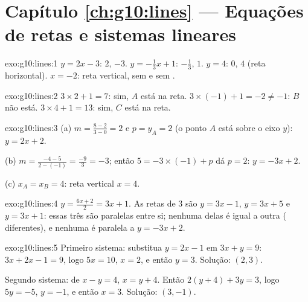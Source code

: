 \section*{Capítulo \ref{ch:g10:lines} --- Equações de retas e sistemas lineares}

\begin{solution}{exo:g10:lines:1}
$y = 2x - 3$:  $2$,  $-3$.
$y = -\frac13 x + 1$:  $-\frac13$, 
$1$.
$y = 4$:  $0$,  $4$ (reta
horizontal).
$x = -2$: reta vertical, sem  e sem .
\end{solution}

\begin{solution}{exo:g10:lines:2}
$3 \times 2 + 1 = 7$: sim, $A$ está na reta.
$3 \times (-1) + 1 = -2 \neq -1$: $B$ não está.
$3 \times 4 + 1 = 13$: sim, $C$ está na reta.
\end{solution}

\begin{solution}{exo:g10:lines:3}
(a) $m = \frac{8 - 2}{3 - 0} = 2$ e $p = y_A = 2$ (o ponto $A$ está sobre
o eixo $y$): $y = 2x + 2$.

(b) $m = \frac{-4 - 5}{2 - (-1)} = \frac{-9}{3} = -3$; então
$5 = -3 \times (-1) + p$ dá $p = 2$: $y = -3x + 2$.

(c) $x_A = x_B = 4$: reta vertical $x = 4$.
\end{solution}

\begin{solution}{exo:g10:lines:4}
$y = \frac{6x+2}{2} = 3x + 1$. As retas de  $3$ são
$y = 3x - 1$, $y = 3x + 5$ e $y = 3x + 1$: essas três são paralelas entre
si; nenhuma delas é igual a outra ( diferentes), e
nenhuma é paralela a $y = -3x + 2$.
\end{solution}

\begin{solution}{exo:g10:lines:5}
Primeiro sistema: substitua $y = 2x - 1$ em $3x + y = 9$:
$3x + 2x - 1 = 9$, logo $5x = 10$, $x = 2$, e então $y = 3$. Solução:
$(2, 3)$.

Segundo sistema: de $x - y = 4$, $x = y + 4$. Então
$2(y + 4) + 3y = 3$, logo $5y = -5$, $y = -1$, e então $x = 3$. Solução:
$(3, -1)$.
\end{solution}

